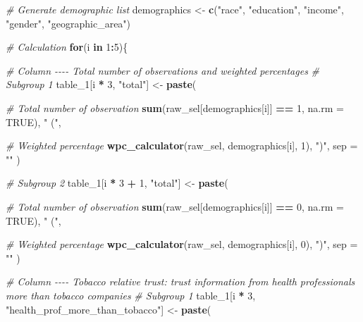 \documentclass[
]{article}
\newenvironment{Shaded}{\begin{snugshade}}{\end{snugshade}}
\newcommand{\AttributeTok}[1]{\textcolor[rgb]{0.13,0.29,0.53}{#1}}
\newcommand{\CommentTok}[1]{\textcolor[rgb]{0.56,0.35,0.01}{\textit{#1}}}
\newcommand{\ConstantTok}[1]{\textcolor[rgb]{0.56,0.35,0.01}{#1}}
\newcommand{\ControlFlowTok}[1]{\textcolor[rgb]{0.13,0.29,0.53}{\textbf{#1}}}
\newcommand{\DecValTok}[1]{\textcolor[rgb]{0.00,0.00,0.81}{#1}}
\newcommand{\FunctionTok}[1]{\textcolor[rgb]{0.13,0.29,0.53}{\textbf{#1}}}
\newcommand{\NormalTok}[1]{#1}
\newcommand{\OtherTok}[1]{\textcolor[rgb]{0.56,0.35,0.01}{#1}}
\newcommand{\SpecialCharTok}[1]{\textcolor[rgb]{0.81,0.36,0.00}{\textbf{#1}}}
\newcommand{\StringTok}[1]{\textcolor[rgb]{0.31,0.60,0.02}{#1}}
\begin{document}
\begin{Shaded}
\begin{Highlighting}[]
\CommentTok{\# Generate demographic list}
\NormalTok{demographics }\OtherTok{\textless{}{-}} \FunctionTok{c}\NormalTok{(}\StringTok{"race"}\NormalTok{, }\StringTok{"education"}\NormalTok{, }\StringTok{"income"}\NormalTok{, }\StringTok{"gender"}\NormalTok{, }\StringTok{"geographic\_area"}\NormalTok{)}


\CommentTok{\# Calculation}
\ControlFlowTok{for}\NormalTok{(i }\ControlFlowTok{in} \DecValTok{1}\SpecialCharTok{:}\DecValTok{5}\NormalTok{)\{}
  
  \CommentTok{\# Column {-}{-}{-}{-} Total number of observations and weighted percentages}
  \CommentTok{\# Subgroup 1}
\NormalTok{  table\_1[i }\SpecialCharTok{*} \DecValTok{3}\NormalTok{, }\StringTok{"total"}\NormalTok{] }\OtherTok{\textless{}{-}} \FunctionTok{paste}\NormalTok{(}
    
    \CommentTok{\# Total number of observation}
    \FunctionTok{sum}\NormalTok{(raw\_sel[demographics[i]] }\SpecialCharTok{==} \DecValTok{1}\NormalTok{, }\AttributeTok{na.rm =} \ConstantTok{TRUE}\NormalTok{),}
    \StringTok{" ("}\NormalTok{,}
    
    \CommentTok{\# Weighted percentage}
    \FunctionTok{wpc\_calculator}\NormalTok{(raw\_sel, demographics[i], }\DecValTok{1}\NormalTok{),}
    \StringTok{")"}\NormalTok{,}
    \AttributeTok{sep =} \StringTok{""}
\NormalTok{  )}

  \CommentTok{\# Subgroup 2}
\NormalTok{  table\_1[i }\SpecialCharTok{*} \DecValTok{3} \SpecialCharTok{+} \DecValTok{1}\NormalTok{, }\StringTok{"total"}\NormalTok{] }\OtherTok{\textless{}{-}} \FunctionTok{paste}\NormalTok{(}
    
    \CommentTok{\# Total number of observation}
    \FunctionTok{sum}\NormalTok{(raw\_sel[demographics[i]] }\SpecialCharTok{==} \DecValTok{0}\NormalTok{, }\AttributeTok{na.rm =} \ConstantTok{TRUE}\NormalTok{),}
    \StringTok{" ("}\NormalTok{,}
    
    \CommentTok{\# Weighted percentage}
    \FunctionTok{wpc\_calculator}\NormalTok{(raw\_sel, demographics[i], }\DecValTok{0}\NormalTok{),}
    \StringTok{")"}\NormalTok{,}
    \AttributeTok{sep =} \StringTok{""}
\NormalTok{  )}


  \CommentTok{\# Column {-}{-}{-}{-} Tobacco relative trust: trust information from health professionals more than tobacco companies}
  \CommentTok{\# Subgroup 1}
\NormalTok{  table\_1[i }\SpecialCharTok{*} \DecValTok{3}\NormalTok{, }\StringTok{"health\_prof\_more\_than\_tobacco"}\NormalTok{] }\OtherTok{\textless{}{-}} \FunctionTok{paste}\NormalTok{(}
    

\end{Highlighting}
\end{Shaded}
\end{document}
